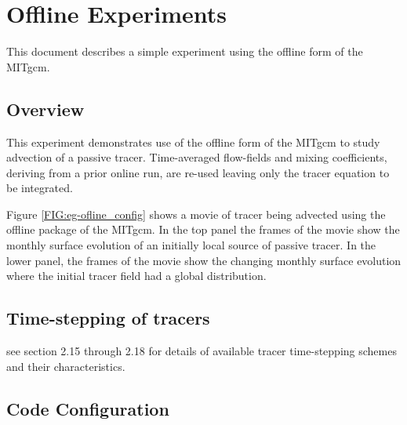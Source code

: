 % 

\section[Offline Example]{Offline Experiments}
\label{www:tutorials}
\label{sect:eg-offline}

%
%

This document describes a simple experiment using the offline form of
the MITgcm.

\subsection{Overview}
\label{www:tutorials}

This experiment demonstrates use of the offline form of the MITgcm to
study advection of a passive tracer. Time-averaged flow-fields and
mixing coefficients, deriving from a prior online run, are re-used
leaving only the tracer equation to be integrated.

Figure \ref{FIG:eg-ofline_config} shows a movie of tracer being
advected using the offline package of the MITgcm. In the top panel the
frames of the movie show the monthly surface evolution of an initially
local source of passive tracer. In the lower panel, the frames of the
movie show the changing monthly surface evolution where the initial
tracer field had a global distribution.

\subsection{Time-stepping of tracers}
\label{www:tutorials}

\noindent see section 2.15 through 2.18 for details of available
tracer time-stepping schemes and their characteristics.

\subsection{Code Configuration}
\label{www:tutorials}
\label{SEC:eg_fourl_code_config}

